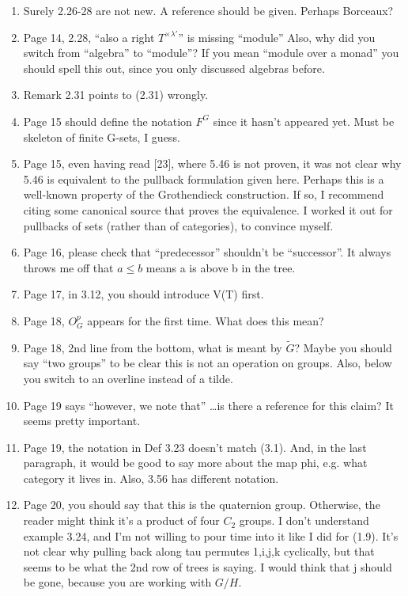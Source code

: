 \documentclass{article}
\begin{document}
\begin{enumerate}
\item
Surely 2.26-28 are not new. A reference should be given. Perhaps Borceaux?

\item
Page 14, 2.28, ``also a right $T^{\times \lambda'}$'' is missing ``module''
Also, why did you switch from ``algebra'' to ``module''? If you mean ``module over a monad'' you should spell this out, since you only discussed algebras before.

\item
Remark 2.31 points to (2.31) wrongly.

\item
Page 15 should define the notation $F^G$ since it hasn't appeared yet. Must be skeleton of finite G-sets, I guess.

\item
Page 15, even having read [23], where 5.46 is not proven, it was not clear why 5.46 is equivalent to the pullback formulation given here. Perhaps this is a well-known property of the Grothendieck construction. If so, I recommend citing some canonical source that proves the equivalence. I worked it out for pullbacks of sets (rather than of categories), to convince myself.

\item
Page 16, please check that ``predecessor'' shouldn't be ``successor''. It always throws me off that $a \leq b$ means a is above b in the tree.

\item
Page 17, in 3.12, you should introduce V(T) first. 

\item
Page 18, $O_G^p$ appears for the first time. What does this mean?

\item
Page 18, 2nd line from the bottom, what is meant by $\tilde{G}$? Maybe you should say ``two groups'' to be clear this is not an operation on groups. Also, below you switch to an overline instead of a tilde.

\item
Page 19 says ``however, we note that'' \dots is there a reference for this claim? It seems pretty important.

\item
Page 19, the notation in Def 3.23 doesn't match (3.1). And, in the last paragraph, it would be good to say more about the map phi, e.g. what category it lives in.
Also, 3.56 has different notation.

\item
Page 20, you should say that this is the quaternion group. Otherwise, the reader might think it's a product of four $C_2$ groups.
I don't understand example 3.24, and I'm not willing to pour time into it like I did for (1.9). It's not clear why pulling back along tau permutes 1,i,j,k cyclically, but that seems to be what the 2nd row of trees is saying. I would think that j should be gone, because you are working with $G/H$.


\end{enumerate}
\end{document}
